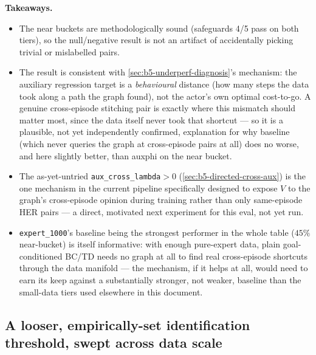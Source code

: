 \documentclass[11pt]{article}
\begin{document}
\textbf{Takeaways.}
\begin{itemize}[leftmargin=1.4em,itemsep=2pt]
\item The near buckets are methodologically sound (safeguards 4/5 pass on both tiers), so the
null/negative result is not an artifact of accidentally picking trivial or mislabelled pairs.
\item The result is consistent with \cref{sec:b5-underperf-diagnosis}'s mechanism: the auxiliary
regression target is a \emph{behavioural} distance (how many steps the data took along a path
the graph found), not the actor's own optimal cost-to-go. A genuine cross-episode stitching pair
is exactly where this mismatch should matter most, since the data itself never took that
shortcut --- so it is a plausible, not yet independently confirmed, explanation for why baseline
(which never queries the graph at cross-episode pairs at all) does no worse, and here slightly
better, than auxphi on the near bucket.
\item The as-yet-untried \texttt{aux\_cross\_lambda}$>0$ (\cref{sec:b5-directed-cross-aux}) is
the one mechanism in the current pipeline specifically designed to expose $V$ to the graph's
cross-episode opinion during training rather than only same-episode HER pairs --- a direct,
motivated next experiment for this eval, not yet run.
\item \texttt{expert\_1000}'s baseline being the strongest performer in the whole table ($45\%$
near-bucket) is itself informative: with enough pure-expert data, plain goal-conditioned BC/TD
needs no graph at all to find real cross-episode shortcuts through the data manifold --- the
mechanism, if it helps at all, would need to earn its keep against a substantially stronger, not
weaker, baseline than the small-data tiers used elsewhere in this document.
\end{itemize}

\subsection{A looser, empirically-set identification threshold, swept across data scale}
\label{sec:b5-eps99-sweep}
\end{document}
